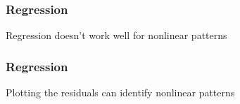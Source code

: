 \documentclass[handout]{beamer}
\begin{document}


   \begin{frame}
   \frametitle{Regression}
   \begin{center}
   \end{center}
   Regression doesn't work well for nonlinear patterns
   \end{frame}



   \begin{frame}
   \frametitle{Regression}
   \begin{center}
   \end{center}
   Plotting the residuals can identify nonlinear patterns
   \end{frame}
\end{document}

